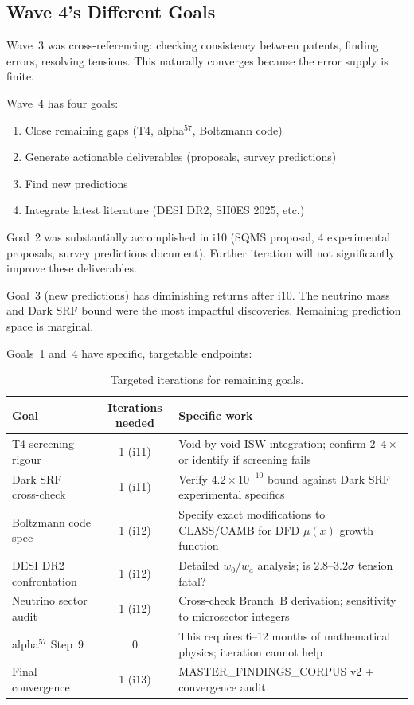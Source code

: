 \documentclass[11pt]{article}
\newcommand{\ee}[1]{\times 10^{#1}}
\begin{document}
\subsection{Wave 4's Different Goals}

Wave~3 was cross-referencing: checking consistency between patents,
finding errors, resolving tensions. This naturally converges because
the error supply is finite.

Wave~4 has four goals:
\begin{enumerate}[nosep]
\item Close remaining gaps (T4, alpha$^{57}$, Boltzmann code)
\item Generate actionable deliverables (proposals, survey predictions)
\item Find new predictions
\item Integrate latest literature (DESI DR2, SH0ES 2025, etc.)
\end{enumerate}

Goal~2 was substantially accomplished in i10 (SQMS proposal, 4 experimental
proposals, survey predictions document). Further iteration will not
significantly improve these deliverables.

Goal~3 (new predictions) has diminishing returns after i10. The
neutrino mass and Dark SRF bound were the most impactful discoveries.
Remaining prediction space is marginal.

Goals~1 and~4 have specific, targetable endpoints:

\begin{table}[H]
\centering
\caption{Targeted iterations for remaining goals.}
\label{tab:targeted}
\begin{tabular}{lcp{7cm}}
\toprule
\textbf{Goal} & \textbf{Iterations needed} & \textbf{Specific work} \\
\midrule
T4 screening rigour & 1 (i11) & Void-by-void ISW integration; confirm
  $2$--$4\times$ or identify if screening fails \\
Dark SRF cross-check & 1 (i11) & Verify $4.2\ee{-10}$ bound against
  Dark SRF experimental specifics \\
Boltzmann code spec & 1 (i12) & Specify exact modifications to CLASS/CAMB
  for DFD $\mu(x)$ growth function \\
DESI DR2 confrontation & 1 (i12) & Detailed $w_0$/$w_a$ analysis; is
  $2.8$--$3.2\sigma$ tension fatal? \\
Neutrino sector audit & 1 (i12) & Cross-check Branch~B derivation;
  sensitivity to microsector integers \\
alpha$^{57}$ Step~9 & 0 & This requires 6--12 months of mathematical
  physics; iteration cannot help \\
Final convergence & 1 (i13) & MASTER\_FINDINGS\_CORPUS v2 + convergence audit \\
\bottomrule
\end{tabular}
\end{table}
\end{document}
